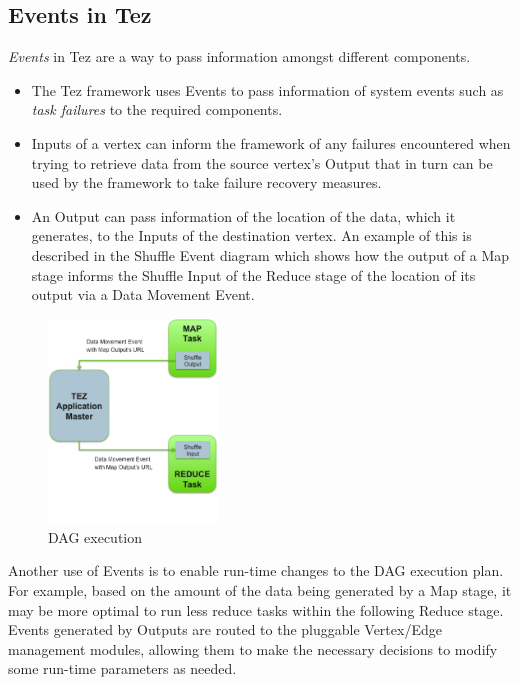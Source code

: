 \documentclass[twocolumn]{article}
\begin{document}
\subsection{Events in Tez}

\emph{Events} in Tez are a way to pass information amongst different
components.

\begin{itemize}

\item
  The Tez framework uses Events to pass information of system events
  such as \emph{task failures} to the required components.
\item
  Inputs of a vertex can inform the framework of any failures
  encountered when trying to retrieve data from the source vertex's
  Output that in turn can be used by the framework to take failure
  recovery measures.
\item
  An Output can pass information of the location of the data, which it
  generates, to the Inputs of the destination vertex. An example of this
  is described in the Shuffle Event diagram which shows how the output
  of a Map stage informs the Shuffle Input of the Reduce stage of the
  location of its output via a Data Movement Event.
\end{itemize}

\begin{figure}[htb]
        \centering
        \includegraphics[width=0.4\textwidth]{tez22}
        \caption{DAG execution}
        \label{fig12}
\end{figure}


Another use of Events is to enable run-time changes to the DAG execution
plan. For example, based on the amount of the data being generated by a
Map stage, it may be more optimal to run less reduce tasks within the
following Reduce stage. Events generated by Outputs are routed to the
pluggable Vertex/Edge management modules, allowing them to make the
necessary decisions to modify some run-time parameters as needed.
\end{document}

